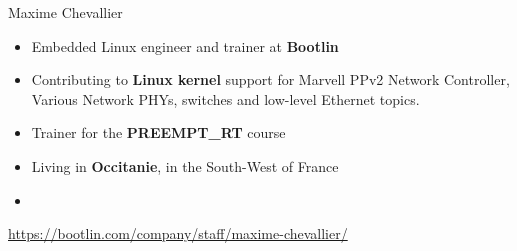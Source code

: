 \begin{frame}{Maxime Chevallier}
    \begin{itemize}
        \item Embedded Linux engineer and trainer at {\bf Bootlin}
        \item Contributing to {\bf Linux kernel} support for Marvell PPv2
                Network Controller, Various Network PHYs, switches and low-level
                    Ethernet topics.
            \item Trainer for the {\bf PREEMPT\_RT} course
        \item Living in {\bf Occitanie}, in the South-West of France
        \item {}
    \end{itemize}
    {\small \url{https://bootlin.com/company/staff/maxime-chevallier/}}
\end{frame}
